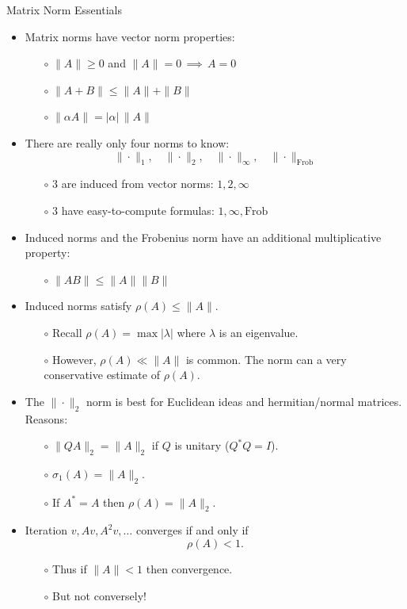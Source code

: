 \documentclass{amsart}
\newcommand{\alert}[1]{{\color{red} #1}}
\begin{document}
\Huge
\centerline{Matrix Norm Essentials}

\thispagestyle{empty}

\bigskip\bigskip\bigskip\bigskip\bigskip
\LARGE
\begin{itemize}
\setlength\itemsep{1em}
\item Matrix norms have vector norm \alert{properties}:
  \begin{itemize}
  \item[$\circ$] $\|A\| \ge 0$ and $\|A\|=0 \,\implies \,A=0$
  \item[$\circ$] $\|A+B\| \le \|A\| + \|B\|$
  \item[$\circ$] $\|\alpha A\| = |\alpha|\,\|A\|$
  \end{itemize}
\item There are really only \alert{four} norms to know:
  $$\|\cdot\|_1, \quad \|\cdot\|_2, \quad \|\cdot\|_\infty, \quad \|\cdot\|_{\mathrm{Frob}}$$
  \begin{itemize}
  \item[$\circ$] 3 are \alert{induced} from vector norms: \quad $1,2,\infty$
  \item[$\circ$] 3 have \alert{easy-to-compute formulas}: \quad $1,\infty,\mathrm{Frob}$
  \end{itemize}
\item Induced norms and the Frobenius norm have an additional \alert{multiplicative} property:
  \begin{itemize}
  \item[$\circ$] $\|A B\|\le \|A\|\|B\|$
  \end{itemize}
\item Induced norms satisfy $\rho(A)\le \|A\|$.
  \begin{itemize}
  \item[$\circ$] Recall $\rho(A) = \max |\lambda|$ where $\lambda$ is an eigenvalue.
  \item[$\circ$] However, $\rho(A)\ll\|A\|$ is common.  The norm can a very conservative estimate of $\rho(A)$.
  \end{itemize}
\item The $\|\cdot\|_2$ norm is best for \alert{Euclidean ideas} and \alert{hermitian/normal matrices}.  Reasons: 
  \begin{itemize}
  \item[$\circ$]  $\|QA\|_2 = \|A\|_2$ if $Q$ is unitary ($Q^* Q = I$).
  \item[$\circ$]  $\sigma_1(A) = \|A\|_2$.
  \item[$\circ$]  If $A^*=A$ then $\rho(A)=\|A\|_2$.
  \end{itemize}
\item \alert{Iteration} $v, Av, A^2v, \dots$ converges if and only if
    $$\rho(A)<1.$$
  \begin{itemize}
  \item[$\circ$] Thus \alert{if} $\|A\|<1$ \alert{then} convergence.
  \item[$\circ$] But not conversely!
  \end{itemize}
\end{itemize}
\end{document}
